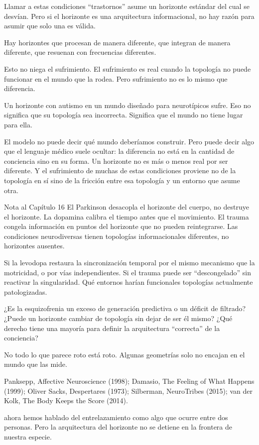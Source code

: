 \noindent Llamar a estas condiciones “trastornos” asume un horizonte estándar del cual se desvían. Pero si el horizonte es una arquitectura informacional, no hay razón para asumir que solo una es válida.

Hay horizontes que procesan de manera diferente, que integran de manera diferente, que resuenan con frecuencias diferentes.

Esto no niega el sufrimiento. El sufrimiento es real cuando la topología no puede funcionar en el mundo que la rodea. Pero sufrimiento no es lo mismo que diferencia.

Un horizonte con autismo en un mundo diseñado para neurotípicos sufre. Eso no significa que su topología sea incorrecta. Significa que el mundo no tiene lugar para ella.

El modelo no puede decir qué mundo deberíamos construir. Pero puede decir algo que el lenguaje médico suele ocultar: la diferencia no está en la cantidad de conciencia sino en su forma. Un horizonte no es más o menos real por ser diferente. Y el sufrimiento de muchas de estas condiciones proviene no de la topología en sí sino de la fricción entre esa topología y un entorno que asume otra.

\begin{notacap}{Nota al Capítulo 16}
 El Parkinson desacopla el horizonte del cuerpo, no destruye el horizonte. La dopamina calibra el tiempo antes que el movimiento. El trauma congela información en puntos del horizonte que no pueden reintegrarse. Las condiciones neurodiversas tienen topologías informacionales diferentes, no horizontes ausentes.

 Si la levodopa restaura la sincronización temporal por el mismo mecanismo que la motricidad, o por vías independientes. Si el trauma puede ser “descongelado” sin reactivar la singularidad. Qué entornos harían funcionales topologías actualmente patologizadas.

 ¿Es la esquizofrenia un exceso de generación predictiva o un déficit de filtrado? ¿Puede un horizonte cambiar de topología sin dejar de ser él mismo? ¿Qué derecho tiene una mayoría para definir la arquitectura “correcta” de la conciencia?

 No todo lo que parece roto está roto. Algunas geometrías solo no encajan en el mundo que las mide.

 Panksepp, Affective Neuroscience (1998); Damasio, The Feeling of What Happens (1999); Oliver Sacks, Despertares (1973); Silberman, NeuroTribes (2015); van der Kolk, The Body Keeps the Score (2014).
\end{notacap}
\noindent {} ahora hemos hablado del entrelazamiento como algo que ocurre entre dos personas. Pero la arquitectura del horizonte no se detiene en la frontera de nuestra especie.

